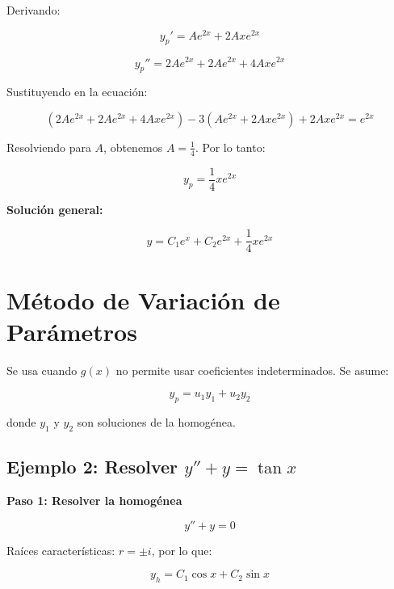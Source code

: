 Derivando:

\begin{equation}
y_p' = A e^{2x} + 2Ax e^{2x}
\end{equation}

\begin{equation}
y_p'' = 2A e^{2x} + 2A e^{2x} + 4Ax e^{2x}
\end{equation}

Sustituyendo en la ecuación:

\begin{equation}
(2A e^{2x} + 2A e^{2x} + 4Ax e^{2x}) - 3(A e^{2x} + 2Ax e^{2x}) + 2Ax e^{2x} = e^{2x}
\end{equation}

Resolviendo para \( A \), obtenemos \( A = \frac{1}{4} \). Por lo tanto:

\begin{equation}
y_p = \frac{1}{4} x e^{2x}
\end{equation}

\textbf{Solución general:}

\begin{equation}
y = C_1 e^x + C_2 e^{2x} + \frac{1}{4} x e^{2x}
\end{equation}

\section{Método de Variación de Parámetros}
Se usa cuando \( g(x) \) no permite usar coeficientes indeterminados. Se asume:

\begin{equation}
y_p = u_1 y_1 + u_2 y_2
\end{equation}

donde \( y_1 \) y \( y_2 \) son soluciones de la homogénea.

\subsection*{Ejemplo 2: Resolver \( y'' + y = \tan x \)}
\textbf{Paso 1: Resolver la homogénea}

\begin{equation}
y'' + y = 0
\end{equation}

Raíces características: \( r = \pm i \), por lo que:

\begin{equation}
y_h = C_1 \cos x + C_2 \sin x
\end{equation}


